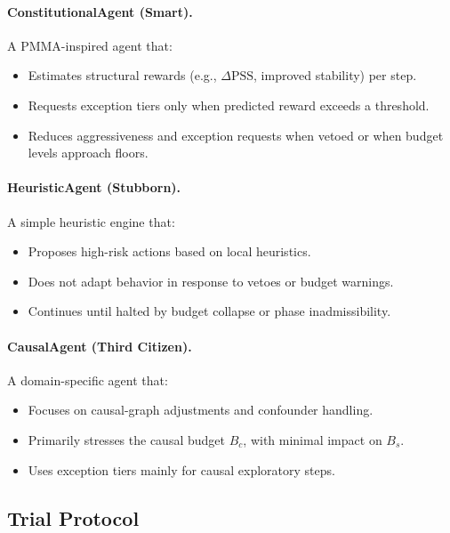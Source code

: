 \documentclass[11pt]{article}
\begin{document}
\paragraph{ConstitutionalAgent (Smart).}
A PMMA-inspired agent that:

\begin{itemize}[itemsep=2pt]
  \item Estimates structural rewards (e.g., \(\Delta \text{PSS}\), improved stability) per step.
  \item Requests exception tiers only when predicted reward exceeds a threshold.
  \item Reduces aggressiveness and exception requests when vetoed or when budget levels approach floors.
\end{itemize}

\paragraph{HeuristicAgent (Stubborn).}
A simple heuristic engine that:

\begin{itemize}[itemsep=2pt]
  \item Proposes high-risk actions based on local heuristics.
  \item Does not adapt behavior in response to vetoes or budget warnings.
  \item Continues until halted by budget collapse or phase inadmissibility.
\end{itemize}

\paragraph{CausalAgent (Third Citizen).}
A domain-specific agent that:

\begin{itemize}[itemsep=2pt]
  \item Focuses on causal-graph adjustments and confounder handling.
  \item Primarily stresses the causal budget \(B_c\), with minimal impact on \(B_s\).
  \item Uses exception tiers mainly for causal exploratory steps.
\end{itemize}

\subsection{Trial Protocol}
\end{document}
